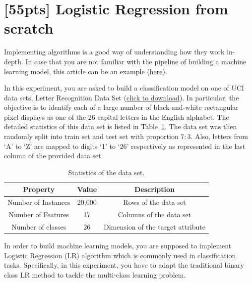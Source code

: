 \documentclass{article}
\begin{document}
\vspace{3cm}


\section{[55pts] Logistic Regression from scratch  }
\noindent Implementing algorithms is a good way of understanding how they work in-depth. In case that you are not familiar with the pipeline of building a machine learning model, this article can be an example (\href{https://www.jianshu.com/p/ecb89148ed64}{here}).

In this experiment, you are asked to build a classification model on one of UCI data sets, Letter Recognition Data Set
(\href{http://lamda.nju.edu.cn/ml2019/ML2019-PS2-dataset.zip}{click to download}). In particular, the objective is to identify each of a large number of black-and-white
rectangular pixel displays as one of the 26 capital letters in the English alphabet. The detailed statistics of this data set is listed in Table~\ref{tab:dataset}. The data set was then randomly split into train set and test set with proportion $7:3$. Also, letters from `A' to `Z' are mapped to digits `1' to `26' respectively as represented in the last column of the provided data set.


\begin{table}[!ht]
    \centering
    \caption{Statistics of the data set.}
    \vspace{2mm}
    \label{tab:dataset}
    \begin{tabular}{|c|c|c|}
    \hline
    Property & Value & Description\\
    \hline
        Number of Instances & 20,000 & Rows of the data set\\
    \hline
        Number of Features & 17 & Columns of the data set\\
    \hline
        Number of classes & 26 & Dimension of the target attribute \\
    \hline
    \end{tabular}
\end{table}


In order to build machine learning models, you are supposed to implement Logistic Regression (LR) algorithm which is commonly used in classification tasks. Specifically, in this experiment, you have to adapt the traditional binary class LR method to tackle the multi-class learning problem. 
\end{document}

